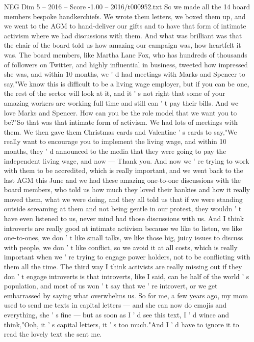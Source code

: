 \begin{textsample}{NEG Dim 5 – 2016 – Score -1.00 – 2016/t000952.txt}
So we made all the 14 board members bespoke handkerchiefs.
We wrote them letters, we boxed them up, and we went to the AGM to hand-deliver our gifts and to have that form of intimate activism where we had discussions with them.
And what was brilliant was that the chair of the board told us how amazing our campaign was, how heartfelt it was.
The board members, like Martha Lane Fox, who has hundreds of thousands of followers on Twitter, and highly influential in business, tweeted how impressed she was, and within 10 months, we ' d had meetings with Marks and Spencer to say,"We know this is difficult to be a living wage employer, but if you can be one, the rest of the sector will look at it, and it ' s not right that some of your amazing workers are working full time and still can ' t pay their bills.
And we love Marks and Spencer.
How can you be the role model that we want you to be?"So that was that intimate form of activism.
We had lots of meetings with them.
We then gave them Christmas cards and Valentine ' s cards to say,"We really want to encourage you to implement the living wage, and within 10 months, they ' d announced to the media that they were going to pay the independent living wage, and now — Thank you.
And now we ' re trying to work with them to be accredited, which is really important, and we went back to the last AGM this June and we had these amazing one-to-one discussions with the board members, who told us how much they loved their hankies and how it really moved them, what we were doing, and they all told us that if we were standing outside screaming at them and not being gentle in our protest, they wouldn ' t have even listened to us, never mind had those discussions with us.
And I think introverts are really good at intimate activism because we like to listen, we like one-to-ones, we don ' t like small talks, we like those big, juicy issues to discuss with people, we don ' t like conflict, so we avoid it at all costs, which is really important when we ' re trying to engage power holders, not to be conflicting with them all the time.
The third way I think activists are really missing out if they don ' t engage introverts is that introverts, like I said, can be half of the world ' s population, and most of us won ' t say that we ' re introvert, or we get embarrassed by saying what overwhelms us.
So for me, a few years ago, my mom used to send me texts in capital letters — and she can now do emojis and everything, she ' s fine — but as soon as I ' d see this text, I ' d wince and think,"Ooh, it ' s capital letters, it ' s too much."And I ' d have to ignore it to read the lovely text she sent me.

\end{textsample}

